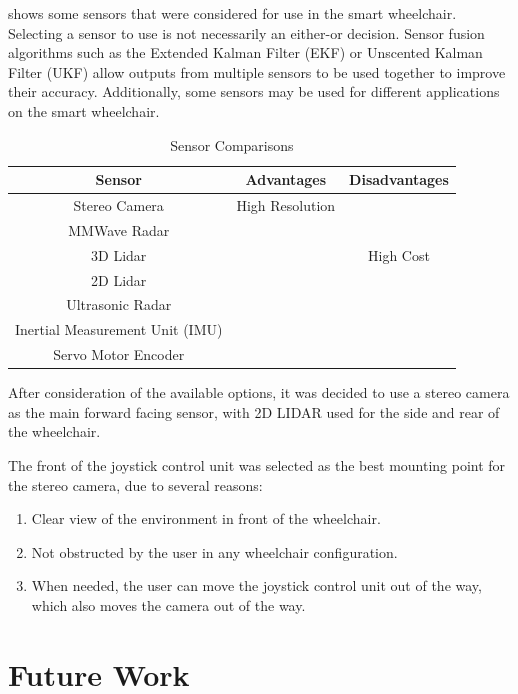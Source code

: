 \documentclass[12pt]{article}
\begin{document}
 shows some sensors that were considered for use in the smart wheelchair.
Selecting a sensor to use is not necessarily an either-or decision. Sensor fusion algorithms such as
the Extended Kalman Filter (EKF) or Unscented Kalman Filter (UKF) \cite{wanUnscentedKalmanFilter2000} allow
outputs from multiple sensors to be used together to improve their accuracy. Additionally, some sensors may
be used for different applications on the smart wheelchair.

\begin{table}
    \centering
    \begin{tabular}{c c c}
    \toprule
    Sensor & Advantages & Disadvantages \\
    \midrule
    Stereo Camera & High Resolution & \\
    MMWave Radar & & \\
    3D Lidar & & High Cost \\
    2D Lidar & & \\
    Ultrasonic Radar & & \\
    Inertial Measurement Unit (IMU) & & \\
    Servo Motor Encoder & & \\
    \bottomrule
    \end{tabular}
    \caption{Sensor Comparisons}
    \label{table:sensor_options}
\end{table}

After consideration of the available options, it was decided to use a stereo camera as the main
forward facing sensor, with 2D LIDAR used for the side and rear of the wheelchair.

The front of the joystick control unit was selected as the best mounting point for the
stereo camera, due to several reasons:
\begin{enumerate}
    \item Clear view of the environment in front of the wheelchair.
    \item Not obstructed by the user in any wheelchair configuration.
    \item When needed, the user can move the joystick control unit out of the way,
            which also moves the camera out of the way.
\end{enumerate}

\pagebreak

\section{Future Work}
\pagebreak

\printbibliography[heading=bibnumbered]
\end{document}
